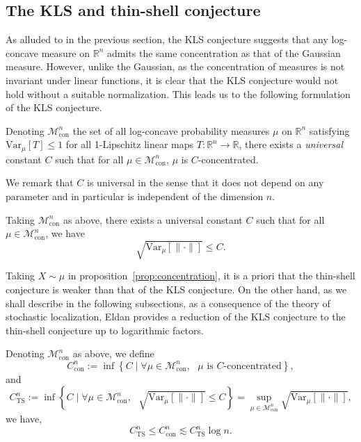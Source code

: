 \subsection{The KLS and thin-shell conjecture}

As alluded to in the previous section, the KLS conjecture suggests that any log-concave measure on 
\(\mathbb{R}^n\) admits the same concentration as that of the Gaussian measure. However, unlike the Gaussian, as the 
concentration of measures is not invariant under linear functions, it is clear that the KLS 
conjecture would not hold without a suitable normalization. This leads us to the following formulation 
of the KLS conjecture.

\begin{conjecture}\label{conj:KLS}
  Denoting \(\mathscr{M}^n_{\text{con}}\) the set of all log-concave probability measures \(\mu\) on 
  \(\mathbb{R}^n\) satisfying \(\text{Var}_\mu[T] \le 1\) for all 1-Lipschitz linear maps 
  \(T : \mathbb{R}^n \to \mathbb{R}\), there exists a \textit{universal} constant \(C\) such that for all 
  \(\mu \in \mathscr{M}^n_{\text{con}}\), \(\mu\) is \(C\)-concentrated.
\end{conjecture}

We remark that \(C\) is universal in the sense that it does not depend on any parameter and in 
particular is independent of the dimension \(n\).

\begin{conjecture}
  Taking \(\mathscr{M}^n_{\text{con}}\) as above, there exists a universal constant \(C\) such that 
  for all \(\mu \in \mathscr{M}^n_{\text{con}}\), we have
  \[\sqrt{\text{Var}_\mu[\|\cdot\|]} \le C.\]
\end{conjecture}

Taking \(X \sim \mu\) in proposition~\ref{prop:concentration}, it is a priori that the thin-shell conjecture is 
weaker than that of the KLS conjecture. On the other hand, as we shall describe in the following subsections, 
as a consequence of the theory of stochastic localization, Eldan \cite{Eldan_2013} provides a reduction 
of the KLS conjecture to the thin-shell conjecture up to logarithmic factors. 

\begin{theorem}\label{thm:KLS_to_TS}
  Denoting \(\mathscr{M}^n_{\text{con}}\) as above, we define 
  \[C^n_{\text{con}} := \inf \left\{C \mid \text{\(\forall \mu \in \mathscr{M}^n_{\text{con}},\) 
    \(\mu\) is \(C\)-concentrated}\right\},\]
  and 
  \[C^n_{\text{TS}} := \inf \left\{C \mid \text{\(\forall \mu \in \mathscr{M}^n_{\text{con}},\) 
      \(\sqrt{\text{Var}_\mu[\|\cdot\|]} \le C\)}\right\}
      = \sup_{\mu \in \mathscr{M}^n_{\text{con}}} \sqrt{\text{Var}_\mu[\|\cdot\|]},\]
  we have,
  \[C^n_{\text{TS}} \le C^n_{\text{con}} \lesssim C^n_{\text{TS}} \log n.\]
\end{theorem}

